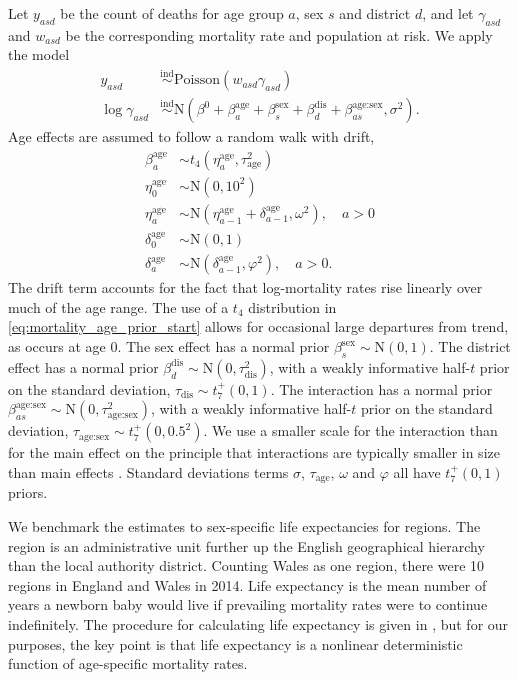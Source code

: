 \documentclass[12pt]{article}
\newcommand{\ind}{\stackrel{\text{ind}}{\sim}}
\begin{document}
Let $y_{asd}$ be the count of deaths for age group $a$, sex $s$ and district $d$, and let $\gamma_{asd}$ and $w_{asd}$ be the corresponding mortality rate and population at risk.  We apply the model
\begin{align}
  y_{asd} & \ind \text{Poisson}( w_{asd} \gamma_{asd} ) \\
  \log \gamma_{asd} & \ind \text{N} \left( \beta^0 + \beta_a^{\text{age}} + \beta_s^{\text{sex}} + \beta_d^{\text{dis}} + \beta_{as}^{\text{age:sex}}, \sigma^2 \right). \label{eq:log_gamma_mortality}
\end{align}
Age effects are assumed to follow a random walk with drift,
\begin{align}
  \beta_a^{\text{age}} & \sim t_4(\eta_a^{\text{age}}, \tau_{\text{age}}^2) \label{eq:mortality_age_prior_start} \\
  \eta_0^{\text{age}} & \sim \text{N}(0, 10^2) \\
  \eta_a^{\text{age}} & \sim \text{N}(\eta_{a-1}^{\text{age}} + \delta_{a-1}^{\text{age}}, \omega^2), \quad a > 0 \\
  \delta_0^{\text{age}} & \sim \text{N}(0, 1) \\
  \delta_a^{\text{age}} & \sim \text{N}(\delta_{a-1}^{\text{age}}, \varphi^2), \quad a > 0 \label{eq:mortality_age_prior_end}.
\end{align}
The drift term accounts for the fact that log-mortality rates rise linearly over much of the age range.
The use of a $t_4$ distribution in \eqref{eq:mortality_age_prior_start} allows for occasional large departures from trend, as occurs at age 0.  The sex effect has a normal prior $\beta_s^{\text{sex}} \sim \text{N}(0,1)$.  The district effect has a normal prior $\beta_d^{\text{dis}} \sim \text{N}(0, \tau_{\text{dis}}^2)$, with a weakly informative half-$t$ prior on the standard deviation, $\tau_{\text{dis}} \sim t_7^{+}(0, 1)$.  The interaction has a normal prior $\beta_{as}^{\text{age:sex}} \sim \text{N}(0, \tau_{\text{age:sex}}^2)$, with a weakly informative half-$t$ prior on the standard deviation, $\tau_{\text{age:sex}} \sim t_7^{+}(0, 0.5^2)$.  We use a smaller scale for the interaction than for the main effect on the principle that interactions are typically smaller in size than main effects \citep{gelman2008weakly}.  Standard deviations terms $\sigma$, $\tau_{\text{age}}$, $\omega$ and $\varphi$ all have $t_7^{+}(0, 1)$ priors.

We benchmark the estimates to sex-specific life expectancies for regions.  The region is an administrative unit further up the English geographical hierarchy than the local authority district.  Counting Wales as one region, there were 10 regions in England and Wales in 2014. Life expectancy is the mean number of years a newborn baby would live if prevailing mortality rates were to continue indefinitely.  The procedure for calculating life expectancy is given in \citet[][ch. 3]{preston2001demography}, but for our purposes, the key point is that life expectancy is a nonlinear deterministic function of age-specific mortality rates.
\end{document}
